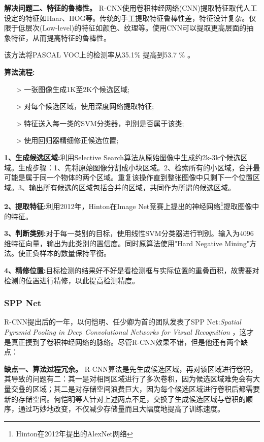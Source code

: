 \textbf{解决问题二、特征的鲁棒性。}
R-CNN使用卷积神经网络(CNN)提取特征取代人工设定的特征如Haar、HOG等。传统的手工提取特征鲁棒性差，特征设计复杂。仅限于低层次(Low-level)的特征如颜色、纹理等。使用CNN可以提取更高层面的抽象特征，从而提高特征的鲁棒性。

该方法将PASCAL VOC上的检测率从35.1\% 提高到53.7 \% 。

\textbf{算法流程:}

\line
\begin{itemize}
	\setlength{\itemsep}{0pt}
	\setlength{\parsep}{0pt}
	\setlength{\parskip}{0pt}
	\item[>] 一张图像生成1K至2K个候选区域;
	\item[>] 对每个候选区域，使用深度网络提取特征;
	\item[>] 特征送入每一类的SVM分类器，判别是否属于该类;
	\item[>] 使用回归器精细修正候选位置;
\end{itemize}
\line

\textbf{1、生成候选区域:}利用Selective Search\cite{ss}算法从原始图像中生成约2k-3k个候选区域。生成步骤：1、先将原始图像分割成小块区域。2、检索所有的小区域，合并最可能是属于同一个物体的两个区域。重复该操作直到整张图像中只剩下一个位置区域。3、输出所有候选的区域包括合并的区域，共同作为所谓的候选区域。

\textbf{2、提取特征:}利用2012年，Hinton在Image Net竞赛上提出的神经网络\footnote{Hinton在2012年提出的AlexNet网络}提取图像中的特征。

\textbf{3、判断类别:}对于每一类别的目标，使用线性SVM\cite{svm}分类器进行判别。输入为4096维特征向量，输出为此类别的置信度。同时原算法使用"Hard Negative Mining"\cite{hnm}方法。使正负样本的数量保持平衡。

\textbf{4、精修位置:}目标检测的结果好不好是看检测框与实际位置的重叠面积，故需要对检测的位置进行精修，以此提高检测精度。 

\subsubsection{SPP Net}
R-CNN提出后的一年，以何恺明、任少卿为首的团队发表了SPP Net:\textit{Spatial Pyramid Pooling in Deep Convolutional Networks for Visual Recognition}\cite{sppnet} ，这才是真正摸到了卷积神经网络的脉络。尽管R-CNN效果不错，但是他还有两个缺点：

\textbf{缺点一、算法过程冗余。}
R-CNN算法是先生成候选区域，再对该区域进行卷积，其导致的问题有二：其一是对相同区域进行了多次卷积，因为候选区域难免会有大量交叠的区域；其二是对存储空间浪费巨大，因为每个候选区域进行卷积后都需要新的存储空间。何恺明等人针对上述两点不足，交换了生成候选区域与卷积的顺序，通过巧妙地改变，不仅减少存储量而且大幅度地提高了训练速度。

